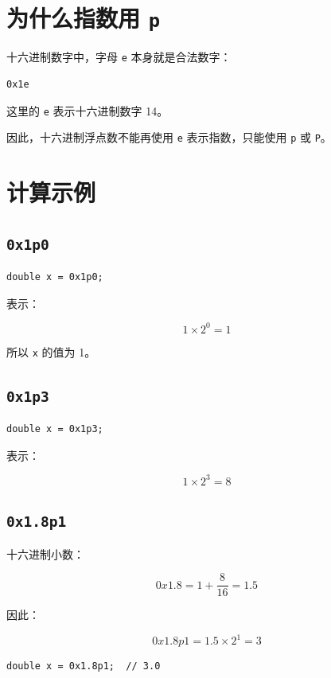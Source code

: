 \documentclass[UTF8,12pt,a4paper]{ctexart}
\begin{document}
\section{为什么指数用 \texttt{p}}

十六进制数字中，字母 \texttt{e} 本身就是合法数字：

\begin{lstlisting}
0x1e
\end{lstlisting}

这里的 \texttt{e} 表示十六进制数字 14。

因此，十六进制浮点数不能再使用 \texttt{e} 表示指数，只能使用
\texttt{p} 或 \texttt{P}。

\section{计算示例}

\subsection{\texttt{0x1p0}}

\begin{lstlisting}
double x = 0x1p0;
\end{lstlisting}

表示：

\[
1 \times 2^0 = 1
\]

所以 \texttt{x} 的值为 1。

\subsection{\texttt{0x1p3}}

\begin{lstlisting}
double x = 0x1p3;
\end{lstlisting}

表示：

\[
1 \times 2^3 = 8
\]

\subsection{\texttt{0x1.8p1}}

十六进制小数：

\[
0x1.8 = 1 + \frac{8}{16} = 1.5
\]

因此：

\[
0x1.8p1 = 1.5 \times 2^1 = 3
\]

\begin{lstlisting}
double x = 0x1.8p1;  // 3.0
\end{lstlisting}
\end{document}
